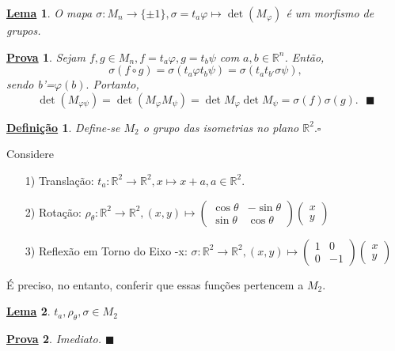 \documentclass{article}
\newtheorem*{def*}{\underline{Defini\c c\~ao}}
\newtheorem*{proof*}{\underline{Prova}}
\newtheorem*{lemma*}{\underline{Lema}}
\renewcommand\qedsymbol{$\blacksquare$}
\begin{document}
   \begin{lemma*}
     O mapa $\sigma :M_{n}\rightarrow \{\pm1\}, \sigma =t_{a}\varphi\mapsto \det{(M_{\varphi })}$ é um morfismo de grupos.
   \end{lemma*}
   \begin{proof*}
     Sejam $f, g\in M_{n}, f = t_{a}\varphi , g = t_{b}\psi$ com $a, b\in \mathbb{R}^{n}$. Então, 
       $$
         \sigma (f\circ{}g) = \sigma (t_{a}\varphi t_{b}\psi) = \sigma (t_{a}t_{b'}\sigma \psi),
       $$ 
    sendo b'=$\varphi (b).$ Portanto, 
      $$
      \det{(M_{\varphi \psi})} = \det{(M_{\varphi }M_{\psi})} = \det{M_{\varphi }}\det{M_{\psi}}=\sigma (f)\sigma (g).\text{ \qedsymbol}
      $$
   \end{proof*}
   \begin{def*}
     Define-se $M_{2}$ o grupo das isometrias no plano $\mathbb{R}^{2}.\square$ 
   \end{def*}
   Considere
  \begin{itemize}
    \item[1)] Translação: $t_{a}:\mathbb{R}^{2}\rightarrow \mathbb{R}^{2}, x\mapsto x+a, a\in \mathbb{R}^{2}.$
    \item[2)] Rotação: $\rho_{\theta }:\mathbb{R}^{2}\rightarrow \mathbb{R}^{2}, (x,y)\mapsto \begin{pmatrix}
        \cos{\theta } & -\sin{\theta } \\
        \sin{\theta } & \cos{\theta }
      \end{pmatrix} \begin{pmatrix}
        x\\
        y
      \end{pmatrix}$
    \item[3)] Reflexão em Torno do Eixo -x: $\sigma :\mathbb{R}^{2}\rightarrow \mathbb{R}^{2}, (x,y)\mapsto \begin{pmatrix}
        1 & 0\\
          0 & -1
    \end{pmatrix}\begin{pmatrix}
      x\\
      y
    \end{pmatrix}$
   \end{itemize}
   É preciso, no entanto, conferir que essas funções pertencem a $M_{2}.$
 \begin{lemma*}
   $t_{a},\rho_{\theta },\sigma \in M_{2}$
 \end{lemma*}
 \begin{proof*}
   Imediato. \qedsymbol
 \end{proof*}
\end{document}
